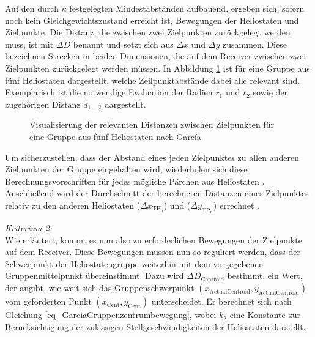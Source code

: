 Auf den durch $\kappa$ festgelegten Mindestabständen aufbauend, ergeben sich, sofern noch kein Gleichgewichtszustand erreicht ist, Bewegungen der Heliostaten und Zielpunkte.
Die Distanz, die zwischen zwei Zielpunkten zurückgelegt werden muss, ist mit $\Delta D$ benannt und setzt sich aus $\Delta x$ und $\Delta y$ zusammen.
Diese bezeichnen Strecken in beiden Dimensionen, die auf dem Receiver zwischen zwei Zielpunkten zurückgelegt werden müssen.
In Abbildung \ref{fig_AbständeGarcia} ist für eine Gruppe aus fünf Heliostaten dargestellt, welche Zeilpunktabstände dabei alle relevant sind.
Exemplarisch ist die notwendige Evaluation der Radien $r_1$ und $r_2$ sowie der zugehörigen Distanz $d_{1-2}$ dargestellt.

\newpage
\begin{figure}[h!]
    \centering
    \setlength{\fboxsep}{1pt}
    \setlength{\fboxrule}{1pt}
    \caption[Visualisierung der relevanten Distanzen zwischen Zielpunkten für eine Gruppe aus fünf Heliostaten nach García]{Visualisierung der relevanten Distanzen zwischen Zielpunkten für eine Gruppe aus fünf Heliostaten nach García \cite[S.7]{Garcia2}}
    \label{fig_AbständeGarcia}
\end{figure}


Um sicherzustellen, dass der Abstand eines jeden Zielpunktes zu allen anderen Zielpunkten der Gruppe eingehalten wird, wiederholen sich diese Berechnungsvorschriften für jedes mögliche Pärchen aus Heliostaten \cite[S.9]{Garcia2}.
Anschließend wird der Durchschnitt der berechneten Distanzen eines Zielpunktes relativ zu den anderen Heliostaten ($\overline{\Delta x_{\mathrm{TP_n}}}$) und ($\overline{\Delta y_{\mathrm{TP_n}}}$) errechnet \cite[S.10]{Garcia2}.

\newpage
\textit{Kriterium 2:}\\
Wie erläutert, kommt es nun also zu erforderlichen Bewegungen der Zielpunkte auf dem Receiver.
Diese Bewegungen müssen nun so reguliert werden, dass der Schwerpunkt der Heliostatengruppe weiterhin mit dem vorgegebenen Gruppenmittelpunkt übereinstimmt.
Dazu wird $\Delta D_{\mathrm{Centroid}}$ bestimmt, ein Wert, der angibt, wie weit sich das Gruppenschwerpunkt $(x_{\mathrm{Actual Centroid}}, y_{\mathrm{Actual Centroid}})$ vom geforderten Punkt $(x_{\mathrm{Cent}}, y_{\mathrm{Cent}})$ unterscheidet.
Er berechnet sich nach Gleichung \ref{eq_GarciaGruppenzentrumbewegung}, wobei $k_2$ eine Konstante zur Berücksichtigung der zulässigen Stellgeschwindigkeiten der Heliostaten darstellt. \cite[S.10]{Garcia2}

